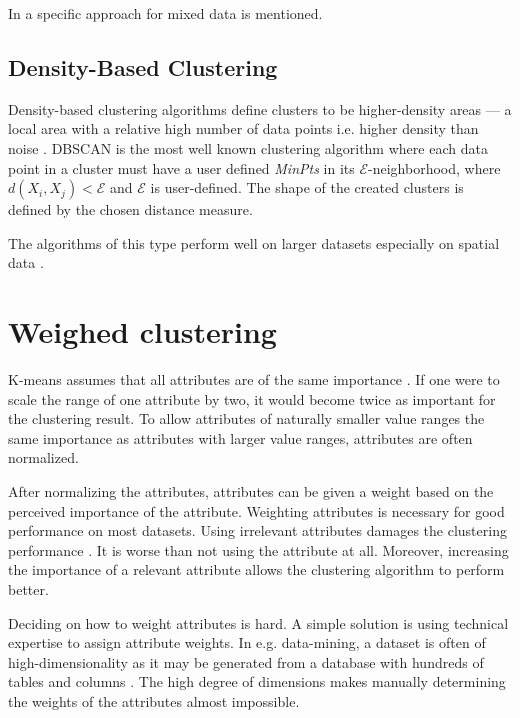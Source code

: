 \documentclass[../report.tex]{subfiles}
\begin{document}
In \cite{Jia2018} a specific approach for mixed data is mentioned.




\subsection{Density-Based Clustering}
\label{sub:density}
Density-based clustering algorithms define clusters to be higher-density areas --- a local area with a relative high number of data points i.e. higher density than noise  \cite{Ester1996, huang2005automated, Xu2015,Jain1999}. DBSCAN \cite{Ester1996} is the most well known clustering algorithm where each data point in a cluster must have a user defined \textit{MinPts} in its $\mathcal{E}$-neighborhood, where $d(X_i,X_j) < \mathcal{E}$ and $\mathcal{E}$ is user-defined. The shape of the created clusters is defined by the chosen distance measure.

The algorithms of this type perform well on larger datasets especially on spatial data \cite{Ester1996}.

\section{Weighed clustering}
\label{ch:weighed}

K-means assumes that all attributes are of the same importance \cite{Kaufman1990}. If one were to scale the range of one attribute by two, it would become twice as important for the clustering result. To allow attributes of naturally smaller value ranges the same importance as attributes with larger value ranges, attributes are often normalized. 

After normalizing the attributes, attributes can be given a weight based on the perceived importance of the attribute. Weighting attributes is necessary for good performance on most datasets. Using irrelevant attributes damages the clustering performance \cite{Kaufman1990}. It is worse than not using the attribute at all. Moreover, increasing the importance of a relevant attribute allows the clustering algorithm to perform better. %

Deciding on how to weight attributes is hard. A simple solution is using technical expertise to assign attribute weights. In e.g. data-mining, a dataset is often of high-dimensionality as it may be generated from a database with hundreds of tables and columns \cite{Jing2007}. The high degree of dimensions makes manually determining the weights of the attributes almost impossible.
\end{document}
